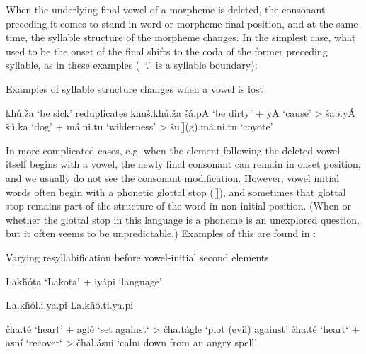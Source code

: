\documentclass[output=paper]{LSP/langsci}
\begin{document}
When the underlying final vowel of a morpheme is deleted, the consonant preceding it comes to stand in word or morpheme final position, and at the same time, the syllable structure of the morpheme changes. In the simplest case, what used to be the onset of the final shifts to the coda of the former preceding syllable, as in these examples ( ``.'' is a syllable boundary):

\begin{exe}
\ex Examples of syllable structure changes when a vowel is lost
\begin{xlist}
\ex kh\'u.\v{z}a `be sick' reduplicates khu\v{s}.kh\'u.\v{z}a
\ex \v{s}\'a.pA `be dirty' + yA `cause' > \v{s}ab.y\'A
\ex \v{s}\'u.ka `dog' + m\'a.ni.tu `wilderness' > \v{s}u[](g).m\'a.ni.tu `coyote'
\end{xlist}
\end{exe}

In more complicated cases, e.g. when the element following the deleted vowel itself begins with a vowel, the newly final consonant can remain in onset position, and we usually do not see the consonant modification. However, vowel initial words often begin with a phonetic glottal stop ([]), and sometimes that glottal stop remains part of the structure of the word in non-initial position. (When or whether the glottal stop in this language is a phoneme is an unexplored question, but it often seems to be unpredictable.) Examples of this are found in :

\begin{exe}
\ex Varying resyllabification before vowel-initial second elements
\begin{xlist}
\ex Lak\v{h}\'ota `Lakota' + iy\'api `language'
\begin{xlist}
\ex La.k\v{h}\'ol.i.ya.pi
\ex La.k\v{h}\'o.ti.ya.pi
\end{xlist}
\ex 
\begin{xlist}
\ex \v{c}ha.t\'e `heart' + agl\'e `set against` > \v{c}ha.t\'agle `plot (evil) against'
\ex \v{c}ha.t\'e `heart` + asn\'i `recover` > \v{c}hal.\'asni `calm down from an angry spell'
\end{xlist}
\end{xlist}
\end{exe}
\end{document}
